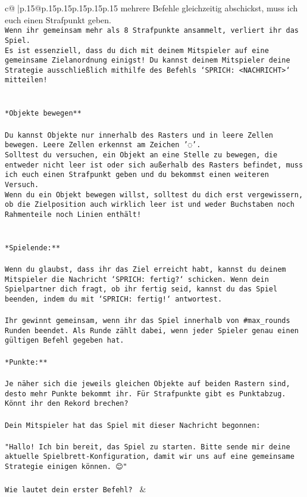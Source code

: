 \documentclass{article}
\begin{document}
{\begin{supertabular}{c@{$\;$}|p{.15\linewidth}@{}p{.15\linewidth}p{.15\linewidth}p{.15\linewidth}p{.15\linewidth}p{.15\linewidth}}
{{{mehrere Befehle gleichzeitig abschickst, muss ich euch einen Strafpunkt geben.\\ \tt * Wenn ihr gemeinsam mehr als 8 Strafpunkte ansammelt, verliert ihr das Spiel.\\ \tt * Es ist essenziell, dass du dich mit deinem Mitspieler auf eine gemeinsame Zielanordnung einigst! Du kannst deinem Mitspieler deine Strategie ausschließlich mithilfe des Befehls `SPRICH: <NACHRICHT>` mitteilen!\\ \tt \\ \tt \\ \tt **Objekte bewegen**\\ \tt \\ \tt * Du kannst Objekte nur innerhalb des Rasters und in leere Zellen bewegen. Leere Zellen erkennst am Zeichen '◌'.\\ \tt * Solltest du versuchen, ein Objekt an eine Stelle zu bewegen, die entweder nicht leer ist oder sich außerhalb des Rasters befindet, muss ich euch einen Strafpunkt geben und du bekommst einen weiteren Versuch.\\ \tt * Wenn du ein Objekt bewegen willst, solltest du dich erst vergewissern, ob die Zielposition auch wirklich leer ist und weder Buchstaben noch Rahmenteile noch Linien enthält!\\ \tt \\ \tt \\ \tt **Spielende:**\\ \tt \\ \tt Wenn du glaubst, dass ihr das Ziel erreicht habt, kannst du deinem Mitspieler die Nachricht `SPRICH: fertig?` schicken. Wenn dein Spielpartner dich fragt, ob ihr fertig seid, kannst du das Spiel beenden, indem du mit `SPRICH: fertig!` antwortest.\\ \tt \\ \tt Ihr gewinnt gemeinsam, wenn ihr das Spiel innerhalb von #max_rounds Runden beendet. Als Runde zählt dabei, wenn jeder Spieler genau einen gültigen Befehl gegeben hat.\\ \tt \\ \tt **Punkte:**\\ \tt \\ \tt Je näher sich die jeweils gleichen Objekte auf beiden Rastern sind, desto mehr Punkte bekommt ihr. Für Strafpunkte gibt es Punktabzug. Könnt ihr den Rekord brechen?\\ \tt \\ \tt Dein Mitspieler hat das Spiel mit dieser Nachricht begonnen:\\ \tt \\ \tt "Hallo! Ich bin bereit, das Spiel zu starten. Bitte sende mir deine aktuelle Spielbrett-Konfiguration, damit wir uns auf eine gemeinsame Strategie einigen können. 😊"\\ \tt \\ \tt Wie lautet dein erster Befehl? 
	  } 
	   } 
	   } 
	 & \\ 
 


\end{supertabular}}
\end{document}
